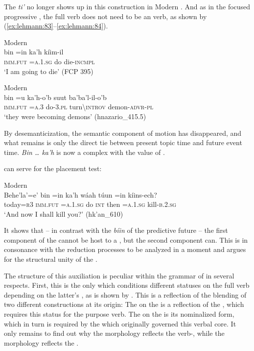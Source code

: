 \documentclass[output=paper]{langsci/langscibook}
\begin{document}
The  \textit{ti’} no longer shows up in this construction in Modern  . And as in the focused progressive , the full verb does not need to be an  verb, as shown by (\ref{ex:lehmann:83}–\ref{ex:lehmann:84}).

\ea\label{ex:lehmann:83}
Modern  \\
\gll       bin      =in      ka'h  kíim-il\\
  \textsc{imm.fut } \textsc{=a.1.sg}   do    die-\textsc{incmpl}\\
\glt ‘I am going to die’ (FCP 395)
\z

\ea\label{ex:lehmann:84}
Modern  \\
\gll       bin      =u    ka'h-o'b  suut      ba'ba'l-il-o'b\\
  \textsc{imm.fut} \textsc{=a.3}   do-3.\textsc{pl}  turn{\textbackslash}\textsc{introv}  demon-\textsc{advr-pl}\\
\glt ‘they were becoming demons’ (hnazario\_415.5)
\z

By desemanticization, the semantic component of motion has disappeared, and what remains is only the direct tie between present topic time and future event time. \textit{Bin … ka’h} is now a complex  with the value of .

 can serve for the  placement test:

\ea\label{ex:lehmann:85}
Modern  \\
\gll       Behe'la'=e'  bin      =in      ka'h  wáah  túun  =in      kíins-ech?\\
  today=\textsc{r3  } \textsc{imm.fut } \textsc{=a.1.sg}    do    \textsc{int}    then  =\textsc{a.1.sg}   kill-\textsc{b.2.sg}\\
\glt ‘And now I shall kill you?’ (hk'an\_610)
\z

It shows that – in contrast with the \textit{bíin} of the predictive future – the first component of the  cannot be host to a , but the second component can. This is in consonance with the reduction processes to be analyzed in a moment and argues for the structural unity of the .

The structure of this auxiliation is peculiar within the grammar of   in several respects. First, this is the only  which conditions different statuses on the full verb depending on the latter’s , as is shown by . This is a reflection of the blending of two different constructions at its origin: The  on the  is a reflection of the , which requires this status for the purpose verb. The  on the  is its nominalized form, which in turn is required by the  which originally governed this verbal core. It only remains to find out why the  morphology reflects the verb-, while the  morphology reflects the .
\end{document}
